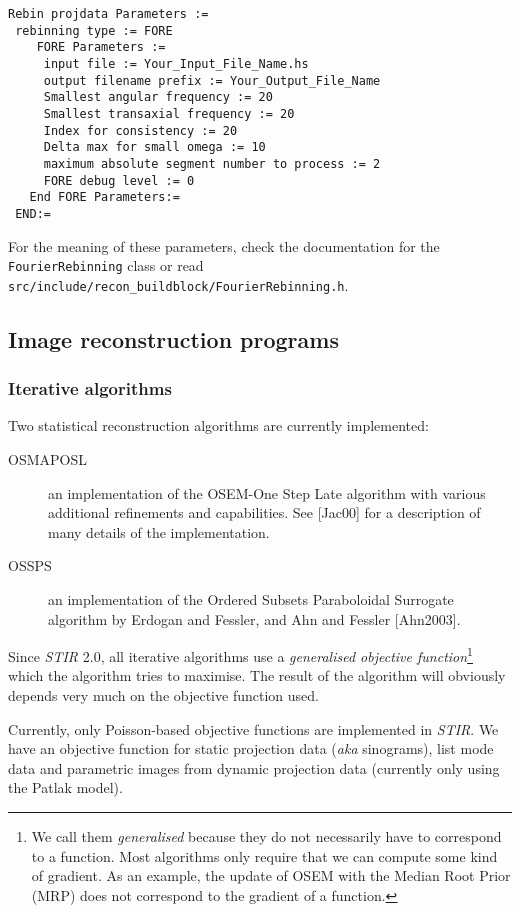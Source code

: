 \documentclass{article}
\begin{document}
{\small 
\begin{verbatim}
Rebin projdata Parameters :=
 rebinning type := FORE
    FORE Parameters :=
     input file := Your_Input_File_Name.hs
     output filename prefix := Your_Output_File_Name
     Smallest angular frequency := 20
     Smallest transaxial frequency := 20
     Index for consistency := 20
     Delta max for small omega := 10
     maximum absolute segment number to process := 2
     FORE debug level := 0
   End FORE Parameters:=
 END:=
\end{verbatim}

For the meaning of these parameters, check the documentation for the
\texttt{FourierRebinning} class or read
\texttt{src/include/recon\_buildblock/FourierRebinning.h}.

\subsection{
Image reconstruction programs}




\subsubsection{
Iterative algorithms}

Two statistical reconstruction algorithms are currently implemented:
\begin{description}
\item[OSMAPOSL] an implementation 
of the OSEM-One Step Late algorithm with various additional refinements 
and capabilities. See [Jac00] for a description of many details of the
implementation.
\item[OSSPS] an implementation of the Ordered Subsets Paraboloidal
Surrogate algorithm by Erdogan and Fessler, and Ahn and Fessler [Ahn2003]. 
\end{description}

Since \textit{STIR} 2.0, all iterative algorithms use a \textit{generalised objective 
function}\footnote{We call them \textit{generalised} because they do not
necessarily have to correspond to a function. Most algorithms only require
that we can compute some kind of gradient. As an example, the update
of OSEM with the Median Root Prior (MRP) does not correspond to the
gradient of a function.} which the algorithm tries to maximise. The result
of the algorithm will obviously depends very much on the objective function
used.

Currently, only Poisson-based objective functions are implemented in \textit{STIR}. We
have an objective function for static projection data (\textit{aka} sinograms),
list mode data and parametric images from dynamic projection data 
(currently only using the Patlak model).

}
\end{document}

